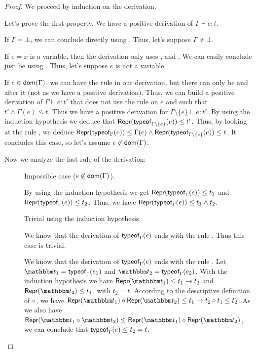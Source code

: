 \documentclass[a4paper]{article}
\theoremstyle{definition}
\begin{document}
  \begin{proof}
  We proceed by induction on the derivation.

  Let's prove the first property. We have a positive derivation of $\Gamma \vdash e:t$.

  If $\Gamma = \bot$, we can conclude directly using . Thus, let's suppose $\Gamma \neq \bot$.

  If $e=x$ is a variable, then the derivation only uses ,  and .
  We can easily conclude just be using . Thus, let's suppose $e$ is not a variable.

  If $e\in\textsf{dom}(\Gamma)$, we can have the rule  in our derivation, but there can only be
   and  after it (not  as we have a positive derivation).
  Thus, we can build a positive derivation of $\Gamma \vdash e:t'$ that does not use the rule  on $e$
  and such that $t'\land \Gamma(e) \leq t$. Thus we have a positive derivation for $\Gamma\setminus\{e\} \vdash e:t'$.
  By using the induction hypothesis we deduce that $\textsf{Repr}(\textsf{typeof}_{\Gamma\setminus\{e\}}(e)) \leq t'$.
  Thus, by looking at the rule ,
  we deduce $\textsf{Repr}(\textsf{typeof}_{\Gamma}(e)) \leq \Gamma(e) \land \textsf{Repr}(\textsf{typeof}_{\Gamma\setminus\{e\}}(e)) \leq t$.
  It concludes this case, so let's assume $e\not\in\textsf{dom}(\Gamma)$.

  Now we analyze the last rule of the derivation:

  \begin{description}
    \item[] Impossible case ($e\not\in\textsf{dom}(\Gamma)$).
    \item[] By using the induction hypothesis we get $\textsf{Repr}(\textsf{typeof}_{\Gamma}(e)) \leq t_1$ and $\textsf{Repr}(\textsf{typeof}_{\Gamma}(e)) \leq t_2$.
    Thus, we have $\textsf{Repr}(\textsf{typeof}_{\Gamma}(e)) \leq t_1 \land t_2$. 
    \item[] Trivial using the induction hypothesis.
    \item[] We know that the derivation of $\textsf{typeof}_{\Gamma}(e)$ ends with the rule .
    Thus this case is trivial.
    \item[] We know that the derivation of $\textsf{typeof}_{\Gamma}(e)$ ends with the rule .
    Let $\ts_1 = \tyof {e_1} \Gamma$ and $\ts_2 = \tyof {e_2} \Gamma$. 
    With the induction hypothesis we have $\tsrep {\ts_1} \leq \arrow {t_1} {t_2}$ and $\tsrep {\ts_2} \leq t_1$, with $t_2=t$.
    According to the descriptive definition of $\circ$, we have
    $\apply{\tsrep {\ts_1}}{\tsrep {\ts_2}} \leq \apply{\arrow {t_1}{t_2}}{t_1} \leq t_2$.
    As we also have $\tsrep{\apply {\ts_1} {\ts_2}} \leq \apply{\tsrep {\ts_1}}{\tsrep {\ts_2}}$,
    we can conclude that $\textsf{typeof}_{\Gamma}(e) \leq t_2=t$.


\end{description}
\end{proof}
\end{document}
